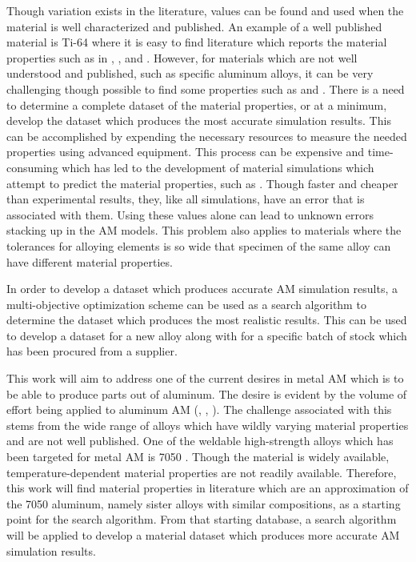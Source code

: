\documentclass[pdflatex,sn-mathphys]{sn-jnl}
\begin{document}
	Though variation exists in the literature, values can be found and used when the material is well characterized and published.  An example of a well published material is Ti-64 where it is easy to find literature which reports the material properties such as in \cite{welschgerhard_1993}, \cite{boivineau_2006}, and  \cite{fan_2012}.  However, for materials which are not well understood and published, such as specific aluminum alloys, it can be very challenging though possible to find some properties such as \cite{lundberg_material_1994} and \cite{leitner_thermophysical_2017}.  There is a need to determine a complete dataset of the material properties, or at a minimum, develop the dataset which produces the most accurate simulation results. 
	This can be accomplished by expending the necessary resources to measure the needed properties using advanced equipment.
	This process can be expensive and time-consuming which has led to the development of material simulations which attempt to predict the material properties, such as \cite{jmatpro}.  Though faster and cheaper than experimental results, they, like all simulations, have an error that is associated with them.  Using these values alone can lead to unknown errors stacking up in the \ac{AM} models.
	This problem also applies to materials where the tolerances for alloying elements is so wide that specimen of the same alloy can have different material properties.  
	
	In order to develop a dataset which produces accurate \ac{AM} simulation results, a multi-objective optimization scheme can be used as a search algorithm to determine the dataset which produces the most realistic results.  This can be used to develop a dataset for a new alloy along with for a specific batch of stock which has been procured from a supplier. 
	
	This work will aim to address one of the current desires in metal \ac{AM} which is to be able to produce parts out of aluminum.  The desire is evident by the volume of effort being applied to aluminum \ac{AM} (\cite{qiHighStrengthLi2020}, \cite{weissImprovedHighTemperatureAluminum2019}, \cite{weissDevelopmentsAluminumScandiumCeramicAluminumScandiumCerium2019}).  The challenge associated with this stems from the wide range of alloys which have wildly varying material properties and are not well published.  One of the weldable high-strength alloys which has been targeted for metal \ac{AM} is 7050 \cite{singhAdditiveManufacturing4047}.  Though the material is widely available, temperature-dependent material properties are not readily available.  Therefore, this work will find material properties in literature which are an approximation of the 7050 aluminum, namely sister alloys with similar compositions, as a starting point for the search algorithm.  From that starting database, a search algorithm will be applied to develop a material dataset which produces more accurate \ac{AM} simulation results. 
	
\end{document}
